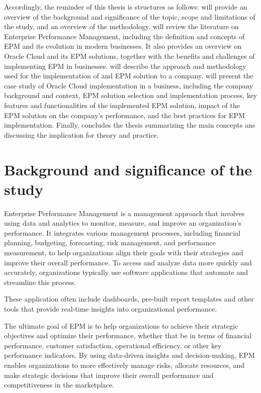 \documentclass[12pt,a4paper,openright,twoside]{book}
\begin{document}
Accordingly, the reminder of this thesis is structures as follows:
%
 will provide an overview of the background and significance of the topic, scope and limitations of the study, and an overview of the methodology.
%
 will review the literature on Enterprise Performance Management, including the definition and concepts of EPM and its evolution in modern businesses. 
%
It also provides an overview on Oracle Cloud and its EPM solutions, together with the benefits and challenges of implementing EPM in businesses. 
%
 will describe the approach and methodology used for the implementation of and EPM solution to a company.
%
 will present the case study of Oracle Cloud implementation in a business, including the company background and context, EPM solution selection and implementation process, key features and functionalities of the implemented EPM solution, impact of the EPM solution on the company's performance, and the best practices for EPM implementation. 
%
Finally,  concludes the thesis summarizing the main concepts ans discussing the implication for theory and practice.

\section{Background and significance of the study}

Enterprise Performance Management is a management approach that involves using data and analytics to monitor, measure, and improve an organization's performance. 
%
It integrates various management processes, including financial planning, budgeting, forecasting, risk management, and performance measurement, to help organizations align their goals with their strategies and improve their overall performance.
%
To access and analyze data more quickly and accurately, organizations typically use software applications that automate and streamline this process.

These application often include dashboards, pre-built report templates and other tools that provide real-time insights into organizational performance.

The ultimate goal of EPM is to help organizations to achieve their strategic objectives and optimize their performance, whether that be in terms of financial performance, customer satisfaction, operational efficiency, or other key performance indicators. 
%
By using data-driven insights and decision-making, EPM enables organizations to more effectively manage risks, allocate resources, and make strategic decisions that improve their overall performance and competitiveness in the marketplace.
\end{document}
